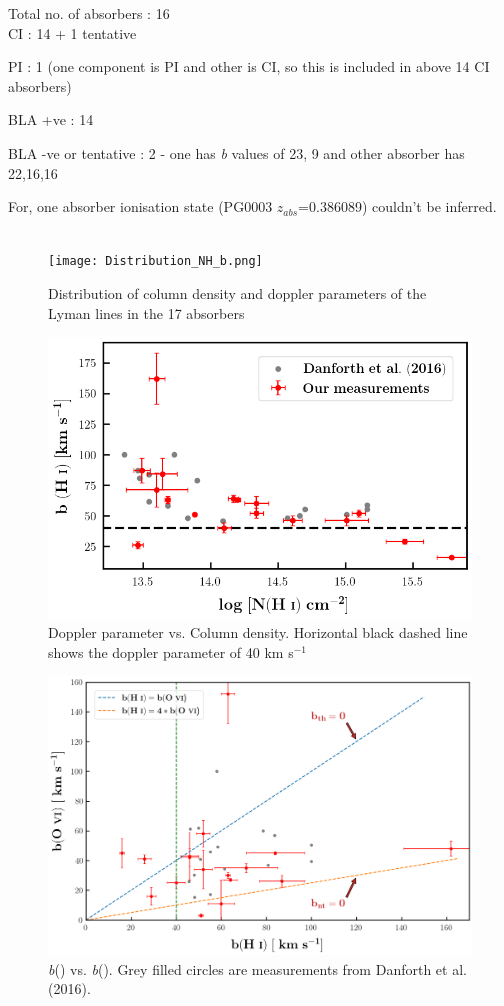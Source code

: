 \documentclass[12pt]{report}
\newcommand\ion[2]{\text{#1\,\textsc{\lowercase{#2}}}}
\begin{document}
Total no. of absorbers : 16 \\

CI : 14 + 1 tentative 

PI : 1 (one component is PI and other is CI, so this is included in above 14 CI absorbers)

BLA +ve : 14 

BLA -ve or tentative : 2 - one has \emph{b} values of 23, 9 and other absorber has 22,16,16 

For, one absorber ionisation state (PG0003 $z_{abs}$=0.386089) couldn't be inferred. \\\\

\newpage

\begin{figure}[!t]
\centering
\texttt{[image: Distribution\_NH\_b.png]}
\caption{Distribution of column density and doppler parameters of the Lyman lines in the 17 absorbers}
\end{figure}

\begin{figure}[!b]
\centering
\includegraphics[width=0.8\linewidth]{Result_plots/NHi_vs_bHi_danforth.png}
\caption{ Doppler parameter vs. Column density. Horizontal black dashed line shows the doppler parameter of 40 km s$^{-1}$}
\end{figure}

\newpage

\begin{figure}[!htbp]
\centering
\includegraphics[width=0.8\linewidth]{Result_plots/bHi_vs_BOvi_danforth.png}
\caption{\emph{b}(\ion{O}{vi}) vs. \emph{b}(\ion{H}{i}). Grey filled circles are measurements from Danforth et al. (2016).}
\end{figure}
\end{document}

